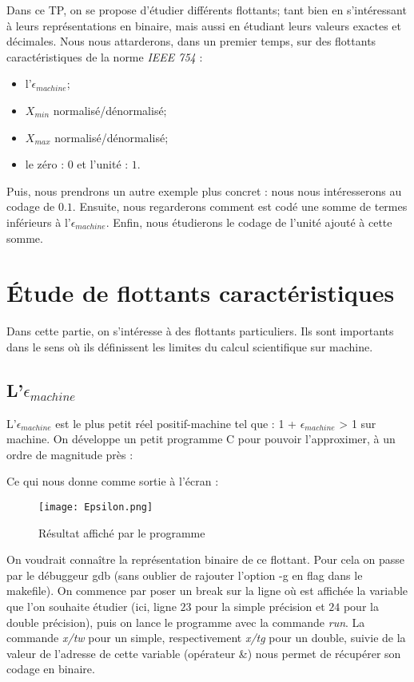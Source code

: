 \documentclass[a4paper, titlepage]{livret} %
\begin{document}
		Dans ce TP, on se propose d'étudier différents flottants; tant bien en s'intéressant à leurs représentations en binaire, mais aussi en étudiant leurs valeurs exactes et décimales.
		Nous nous attarderons, dans un premier temps, sur des flottants caractéristiques de la norme \emph{IEEE 754} : 
		\begin{itemize}
			\item l'$\epsilon_{machine}$;
			\item $X_{min}$ normalisé/dénormalisé;
			\item $X_{max}$ normalisé/dénormalisé;
			\item le zéro : $0$ et l'unité : $1$.
		\end{itemize}	
		Puis, nous prendrons un autre exemple plus concret : nous nous intéresserons au codage de $0.1$.
		Ensuite, nous regarderons comment est codé une somme de termes inférieurs à l'$\epsilon_{machine}$.
		Enfin, nous étudierons le codage de l'unité ajouté à cette somme.

	\setcounter{tocdepth}{1} %
	\tableofcontents %
	
	\chapter{Étude de flottants caractéristiques}
		Dans cette partie, on s'intéresse à des flottants particuliers. 
		Ils sont importants dans le sens où ils définissent les limites du calcul scientifique sur machine.

		\section{L'$\epsilon_{machine}$}
			L'$\epsilon_{machine}$ est le plus petit réel positif-machine tel que : 1 + $\epsilon_{machine}$ > 1 sur machine.
			On développe un petit programme C pour pouvoir l'approximer, à un ordre de magnitude près :
			

			Ce qui nous donne comme sortie à l'écran :
			\begin{figure}[!h]
				\centering
  					\texttt{[image: Epsilon.png]}
  					\caption{Résultat affiché par le programme}
			\end{figure}		

			On voudrait connaître la représentation binaire de ce flottant.
			Pour cela on passe par le débuggeur gdb (sans oublier de rajouter l'option -g en flag dans le makefile).
			On commence par poser un break sur la ligne où est affichée la variable que l'on souhaite étudier (ici, ligne $23$ pour la simple précision et $24$ pour la double précision), puis on lance le programme avec la commande \emph{run}.
			La commande \emph{x/tw} pour un simple, respectivement \emph{x/tg} pour un double, suivie de la valeur de l'adresse de cette variable (opérateur \&) nous permet de récupérer son codage en binaire.
\end{document}
